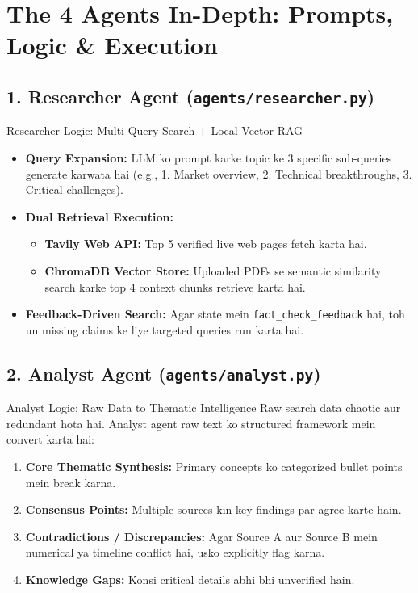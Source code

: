 \documentclass[9.5pt, a4paper]{article}
\begin{document}
\clearpage
\section{The 4 Agents In-Depth: Prompts, Logic \& Execution}

\subsection{1. Researcher Agent (\texttt{agents/researcher.py})}
\begin{agentbox}{Researcher Logic: Multi-Query Search + Local Vector RAG}
\begin{itemize}
    \item \textbf{Query Expansion:} LLM ko prompt karke topic ke 3 specific sub-queries generate karwata hai (e.g., 1. Market overview, 2. Technical breakthroughs, 3. Critical challenges).
    \item \textbf{Dual Retrieval Execution:}
    \begin{itemize}
        \item \textbf{Tavily Web API:} Top 5 verified live web pages fetch karta hai.
        \item \textbf{ChromaDB Vector Store:} Uploaded PDFs se semantic similarity search karke top 4 context chunks retrieve karta hai.
    \end{itemize}
    \item \textbf{Feedback-Driven Search:} Agar state mein \texttt{fact\_check\_feedback} hai, toh un missing claims ke liye targeted queries run karta hai.
\end{itemize}
\end{agentbox}

\vspace{-4pt}
\subsection{2. Analyst Agent (\texttt{agents/analyst.py})}
\begin{agentbox}{Analyst Logic: Raw Data to Thematic Intelligence}
Raw search data chaotic aur redundant hota hai. Analyst agent raw text ko structured framework mein convert karta hai:
\begin{enumerate}
    \item \textbf{Core Thematic Synthesis:} Primary concepts ko categorized bullet points mein break karna.
    \item \textbf{Consensus Points:} Multiple sources kin key findings par agree karte hain.
    \item \textbf{Contradictions / Discrepancies:} Agar Source A aur Source B mein numerical ya timeline conflict hai, usko explicitly flag karna.
    \item \textbf{Knowledge Gaps:} Konsi critical details abhi bhi unverified hain.
\end{enumerate}
\end{agentbox}
\end{document}
